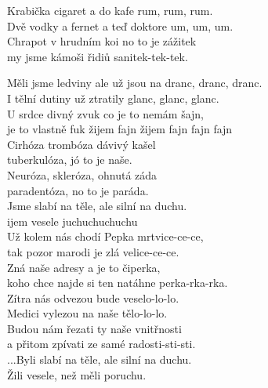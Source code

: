 
\ve{}
Krabička cigaret a do kafe rum, rum, rum.\\
Dvě vodky a fernet a teď doktore um, um, um.\\
Chrapot v hrudním koi no to je zážitek\\
my jsme kámoši řidiů sanitek-tek-tek.

\ve{}
Měli jsme ledviny ale už jsou na dranc, dranc, dranc.\\
I tělní dutiny už ztratily glanc, glanc, glanc.\\
U srdce divný zvuk co je to nemám šajn,\\
je to vlastně fuk žijem fajn žijem fajn fajn fajn\\

\cho{}
Cirhóza trombóza dávivý kašel\\
tuberkulóza, jó to je naše.\\
Neuróza, skleróza, ohnutá záda\\
paradentóza, no to je paráda.\\
Jsme slabí na těle, ale silní na duchu.\\
ijem vesele juchuchuchuchu\\

\ve{}
Už kolem nás chodí Pepka mrtvice-ce-ce,\\
tak pozor marodi je zlá velice-ce-ce.\\
Zná naše adresy a je to čiperka,\\
koho chce najde si ten natáhne perka-rka-rka.\\

\ve{}
Zítra nás odvezou bude veselo-lo-lo.\\
Medici vylezou na naše tělo-lo-lo.\\
Budou nám řezati ty naše vnitřnosti\\
a přitom zpívati ze samé radosti-sti-sti.\\

\cho{}
...Byli slabí na těle, ale silní na duchu.\\
Žili vesele, než měli poruchu.\\

\esong